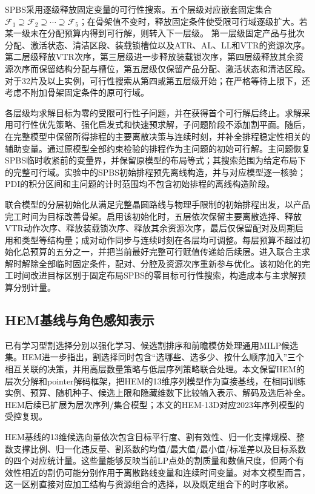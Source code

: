 \documentclass[final,5p,times,twocolumn]{elsarticle}
\begin{document}
SPBS采用逐级释放固定变量的可行性搜索。五个层级对应嵌套固定集合$\mathcal F_1\supseteq\mathcal F_2\supseteq\cdots\supseteq\mathcal F_5$；在骨架值不变时，释放固定条件使受限可行域逐级扩大。若某一级未在分配预算内得到可行解，则转入下一层级。
第一层级固定产品与批次分配、激活状态、清洁区段、装载锁槽位以及ATR、AL、LL和VTR的资源次序。第二层级释放VTR次序，第三层级进一步释放装载锁次序，第四层级释放其余资源次序而保留结构分配与槽位，第五层级仅保留产品分配、激活状态和清洁区段。对于32片及以上实例，可行性搜索从第四或第五层级开始；在严格等待上限下，还考虑不附加骨架固定条件的原可行域。

各层级均求解目标为零的受限可行性子问题，并在获得首个可行解后终止。求解采用可行性优先策略、强化启发式和快速预求解，子问题阶段不添加割平面。随后，在完整模型中保留所得排程的主要离散决策与连续时刻，并补全排程稳定性相关的辅助变量。通过原模型全部约束检验的排程作为主问题的初始可行解。主问题恢复SPBS临时收紧前的变量界，并保留原模型的布局等式；其搜索范围为给定布局下的完整可行域。实验中的SPBS初始排程预先离线构造，并与对应模型逐一核验；PDI的积分区间和主问题的计时范围均不包含初始排程的离线构造阶段。

联合模型的分层初始化从满足完整晶圆路线与物理手限制的初始排程出发，以产品完工时间为目标改善骨架。启用该初始化时，五层依次保留主要离散选择、释放VTR动作次序、释放装载锁次序、释放其余资源次序，最后仅保留配对及周期启用和类型等结构量；成对动作同步与连续时刻在各层均可调整。每层预算不超过初始化总预算的五分之一，并把当前最好完整可行赋值传递给后续层。进入联合主求解时解除全部临时固定条件，配对、分腔及资源次序重新参与优化。该初始化的完工时间改进目标区别于固定布局SPBS的零目标可行性搜索，构造成本与主求解预算分别计量。

\subsection{HEM基线与角色感知表示}

已有学习型割选择分别以强化学习、候选割排序和前瞻模仿处理通用MILP候选集\citep{tang2020cut,huang2022cutranking,paulus2022looking}。HEM进一步指出，割选择同时包含“选哪些、选多少、按什么顺序加入”三个相互关联的决策，并用高层数量策略与低层序列策略联合处理\citep{wang2023hem}。本文保留HEM的层次分解和pointer解码框架，把HEM的13维序列模型作为直接基线，在相同训练实例、预算、随机种子、候选上限和隐藏维数下比较输入表示、解码及选后补全。HEM后续已扩展为层次序列/集合模型\citep{wang2024hemset}；本文的HEM-13D对应2023年序列模型的受控复现。

HEM基线的13维候选向量依次包含目标平行度、割有效性、归一化支撑规模、整数支撑比例、归一化违反量、割系数的均值/最大值/最小值/标准差以及目标系数的四个对应统计量。这些量能够反映当前LP点处的割质量和数值尺度，但两个有效性相近的割仍可能分别作用于离散路线变量和连续时间变量。对本文模型而言，这一区别直接对应加工结构与资源组合的选择，以及既定组合下的时序收紧。
\end{document}
